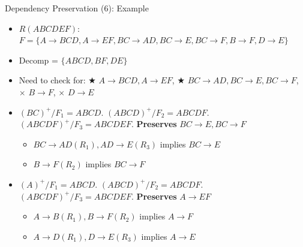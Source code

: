 \documentclass[aspectratio=169, xcolor=dvipsnames]{beamer}
\begin{document}
\begin{frame}{Dependency Preservation (6): Example}
    \begin{itemize}[<+->]
        \item $R(ABCDEF)$: $F = \{A \rightarrow BCD, A \rightarrow EF, BC \rightarrow AD, BC \rightarrow E, BC \rightarrow F, B \rightarrow F, D \rightarrow E\}$
        \item Decomp = $\{ABCD, BF, DE\}$
        \item Need to check for: $\bigstar$ $A \rightarrow BCD, A \rightarrow EF$, $\bigstar$ $BC \rightarrow AD, BC \rightarrow E, BC \rightarrow F$, $\times$ $B \rightarrow F$, $\times$ $D \rightarrow E$
        \item $(BC)^+ / F_1 = ABCD$. $(ABCD)^+ / F_2 = ABCDF$. $(ABCDF)^+ / F_3 = ABCDEF$. \textbf{Preserves} $BC \rightarrow E, BC \rightarrow F$
        \begin{itemize}
            \item[$\triangleright$] $BC \rightarrow AD (R_1), AD \rightarrow E (R_3)$ implies $BC \rightarrow E$
            \item[$\triangleright$] $B \rightarrow F (R_2)$ implies $BC \rightarrow F$
        \end{itemize}
        \item $(A)^+ / F_1 = ABCD$. $(ABCD)^+ / F_2 = ABCDF$. $(ABCDF)^+ / F_3 = ABCDEF$. \textbf{Preserves} $A \rightarrow EF$
        \begin{itemize}
            \item[$\triangleright$] $A \rightarrow B (R_1), B \rightarrow F (R_2)$ implies $A \rightarrow F$
            \item[$\triangleright$] $A \rightarrow D (R_1), D \rightarrow E (R_3)$ implies $A \rightarrow E$
        \end{itemize}
    \end{itemize}
\end{frame}
\end{document}
